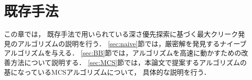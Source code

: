 \chapter{既存手法}
\label{ch:prelm}

この章では， 
既存手法で用いられている深さ優先探索に基づく最大クリーク発見のアルゴリズムの説明を行う．
\ref{sec:naive}節では，厳密解を発見するナイーブアルゴリズムを与える．
\ref{sec:BB}節では，アルゴリズムを高速に動かすための改善方法について説明する．
\ref{sec:MCS}節では，本論文で提案するアルゴリズムの基になっているMCSアルゴリズム\cite{tomita2010simple}\cite{tomita2013simple}について，
具体的な説明を行う．
